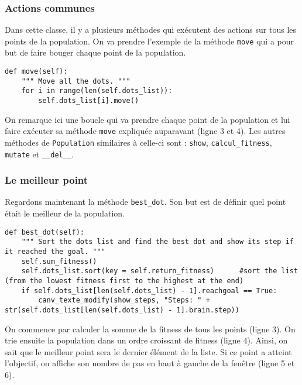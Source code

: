 \documentclass[12pt, a4paper, openany]{book}
\begin{document}
\subsubsection{Actions communes}
Dans cette classe, il y a plusieurs méthodes qui exécutent des actions sur tous les points de la population. On va prendre l'exemple de la méthode \verb'move' qui a pour but de faire bouger chaque point de la population.
\begin{verbatim}
def move(self):
	""" Move all the dots. """
	for i in range(len(self.dots_list)):	
		self.dots_list[i].move()
\end{verbatim}
On remarque ici une boucle qui va prendre chaque point de la population et lui faire exécuter sa méthode \verb'move' expliquée auparavant (ligne 3 et 4). Les autres méthodes de \verb'Population' similaires à celle-ci sont : \verb'show', \verb'calcul_fitness', \verb'mutate' et \verb'__del__'.

\subsubsection{Le meilleur point}
Regardons maintenant la méthode \verb'best_dot'. Son but est de définir quel point était le meilleur de la population.
\begin{verbatim}
def best_dot(self):
	""" Sort the dots list and find the best dot and show its step if it reached the goal. """
	self.sum_fitness()
	self.dots_list.sort(key = self.return_fitness)		#sort the list (from the lowest fitness first to the highest at the end)
	if self.dots_list[len(self.dots_list) - 1].reachgoal == True:
		canv_texte_modify(show_steps, "Steps: " + str(self.dots_list[len(self.dots_list) - 1].brain.step))
\end{verbatim}
On commence par calculer la somme de la fitness de tous les points (ligne 3). On trie ensuite la population dans un ordre croissant de fitness (ligne 4). Ainsi, on sait que le meilleur point sera le dernier élément de la liste. Si ce point a atteint l'objectif, on affiche son nombre de \og pas\fg{} en haut à gauche de la fenêtre (ligne 5 et 6).
\end{document}
